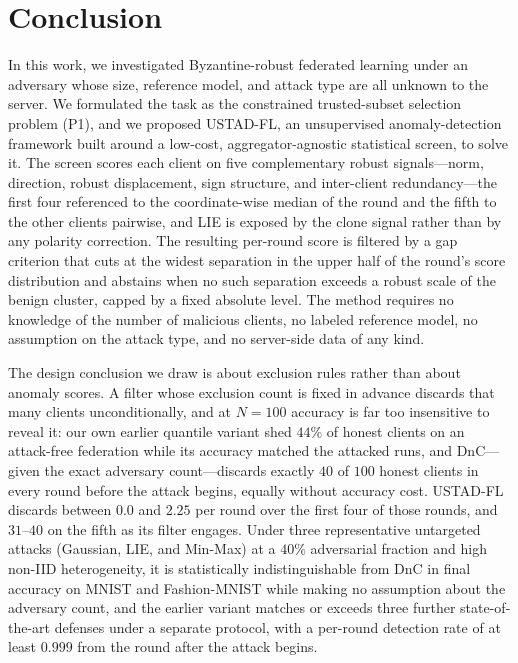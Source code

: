 \documentclass[journal]{IEEEtran}
\begin{document}
\section{Conclusion}
\label{sec:conclusion}

In this work, we investigated Byzantine-robust federated learning under an adversary whose size, reference model, and attack type are all unknown to the server. We formulated the task as the constrained trusted-subset selection problem (P1), and we proposed USTAD-FL, an unsupervised anomaly-detection framework built around a low-cost, aggregator-agnostic statistical screen, to solve it. The screen scores each client on five complementary robust signals---norm, direction, robust displacement, sign structure, and inter-client redundancy---the first four referenced to the coordinate-wise median of the round and the fifth to the other clients pairwise, and LIE is exposed by the clone signal rather than by any polarity correction. The resulting per-round score is filtered by a gap criterion that cuts at the widest separation in the upper half of the round's score distribution and abstains when no such separation exceeds a robust scale of the benign cluster, capped by a fixed absolute level. The method requires no knowledge of the number of malicious clients, no labeled reference model, no assumption on the attack type, and no server-side data of any kind.

The design conclusion we draw is about exclusion rules rather than about anomaly scores. A filter whose exclusion count is fixed in advance discards that many clients unconditionally, and at $N=100$ accuracy is far too insensitive to reveal it: our own earlier quantile variant shed $44\%$ of honest clients on an attack-free federation while its accuracy matched the attacked runs, and DnC---given the exact adversary count---discards exactly $40$ of $100$ honest clients in every round before the attack begins, equally without accuracy cost. USTAD-FL discards between $0.0$ and $2.25$ per round over the first four of those rounds, and $31$--$40$ on the fifth as its filter engages. Under three representative untargeted attacks (Gaussian, LIE, and Min-Max) at a $40\%$ adversarial fraction and high non-IID heterogeneity, it is statistically indistinguishable from DnC in final accuracy on MNIST and Fashion-MNIST while making no assumption about the adversary count, and the earlier variant matches or exceeds three further state-of-the-art defenses under a separate protocol, with a per-round detection rate of at least $0.999$ from the round after the attack begins.
\end{document}
